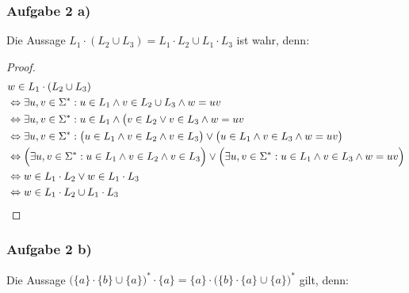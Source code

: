 \subsubsection{Aufgabe 2 a)}
Die Aussage $L_1\cdot(L_2\cup L_3)=L_1\cdot L_2\cup L_1\cdot L_3$ ist wahr, denn:
\begin{proof}
	\begin{align*}
		&w\in L_1\cdot(L_2\cup L_3)\\
		&\Leftrightarrow\exists u,v\in\Sigma^\ast:u\in L_1\wedge v\in L_2\cup L_3\wedge w=uv\\
		&\Leftrightarrow\exists u,v\in\Sigma^\ast:u\in L_1\wedge \big(v\in L_2\vee v\in L_3\wedge w=uv\\
		&\Leftrightarrow\exists u,v\in\Sigma^\ast:\big(u\in L_1\wedge v\in L_2\wedge v\in L_3\big)\vee\big(u\in L_1\wedge v\in L_3\wedge w=uv\big)\\
		&\Leftrightarrow\Big(\exists u,v\in\Sigma^\ast:u\in L_1\wedge v\in L_2\wedge v\in L_3\Big)\vee
		\Big(\exists u,v\in\Sigma^\ast:u\in L_1\wedge v\in L_3\wedge w=uv\Big)\\
		&\Leftrightarrow w\in L_1\cdot L_2\vee w\in L_1\cdot L_3\\
		&\Leftrightarrow w\in L_1\cdot L_2\cup L_1\cdot L_3
	\end{align*}
\end{proof}

\subsubsection{Aufgabe 2 b)}
Die Aussage $\big(\lbrace a\rbrace\cdot\lbrace b\rbrace\cup\lbrace a\rbrace\big)^\ast\cdot\lbrace a\rbrace=\lbrace a\rbrace\cdot\big(\lbrace b\rbrace\cdot\lbrace a\rbrace\cup\lbrace a\rbrace\big)^\ast$ gilt, denn:

